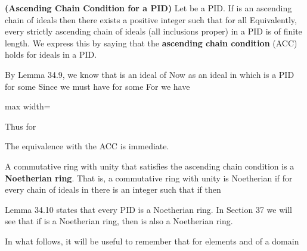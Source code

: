 \documentclass[11pt,oneside]{article}
\begin{document}
\begin{BookBody}
 \textbf{(Ascending Chain Condition for a PID)} Let  be a PID. If  is an ascending chain of ideals  then there exists a positive integer  such that  for all  Equivalently, every strictly ascending chain of ideals (all inclusions proper) in a PID is of finite length. We express this by saying that the\textbf{ ascending chain condition} (ACC) holds for ideals in a PID.

 By Lemma 34.9, we know that  is an ideal of  Now as an ideal in  which is a PID for some  Since  we must have  for some  For  we have

\begin{center}\begin{adjustbox}{max width=\linewidth}\end{adjustbox}\end{center}

\noindent Thus  for 

The equivalence with the ACC is immediate. \BookEnd{\blacklozenge}

 A commutative ring with unity  that satisfies the ascending chain condition is a \textbf{Noetherian ring}. That is, a commutative ring with unity  is Noetherian if for every chain of ideals  in  there is an integer  such that if  then \BookEnd{\blacksquare}

\noindent Lemma 34.10 states that every PID is a Noetherian ring. In Section 37 we will see that if  is a Noetherian ring, then  is also a Noetherian ring.

In what follows, it will be useful to remember that for elements  and  of a domain 


\end{BookBody}
\end{document}
